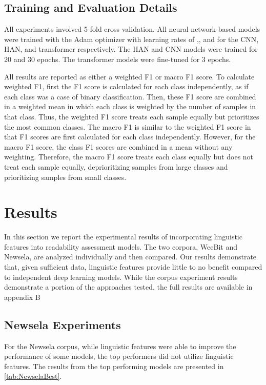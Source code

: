 \documentclass[11pt,a4paper]{article}
\theoremstyle{definition}
\begin{document}
\subsection{Training and Evaluation Details}
All experiments involved 5-fold cross validation. All neural-network-based models were trained with the Adam optimizer \citep{DBLP:journals/corr/KingmaB14} with learning rates of ,, and  for the CNN, HAN, and transformer respectively. The HAN and CNN models were trained for 20 and 30 epochs. The transformer models were fine-tuned for 3 epochs.

All results are reported as either a weighted F1 or macro F1 score. To calculate weighted F1, first the F1 score is calculated for each class independently, as if each class was a case of binary classification. Then, these F1 score are combined in a weighted mean in which each class is weighted by the number of samples in that class. Thus, the weighted F1 score treats each sample equally but prioritizes the most common classes. The macro F1 is similar to the weighted F1 score in that F1 scores are first calculated for each class independently. However, for the macro F1 score, the class F1 scores are combined in a mean without any weighting. Therefore, the macro F1 score treats each class equally but does not treat each sample equally, deprioritizing samples from large classes and prioritizing samples from small classes.

\section{Results}
\label{sec:results}
In this section we report the experimental results of incorporating linguistic features into readability assessment models. The two corpora, WeeBit and Newsela, are analyzed individually and then compared. Our results demonstrate that, given sufficient data, linguistic features provide little to no benefit compared to independent deep learning models. While the corpus experiment results demonstrate a portion of the approaches tested, the full results are available in appendix B

\subsection{Newsela Experiments}
\label{sec:NewselaExperiments}

For the Newsela corpus, while linguistic features were able to improve the performance of some models, the top performers did not utilize linguistic features. The results from the top performing models are presented in \cref{tab:NewselaBest}.
\end{document}
